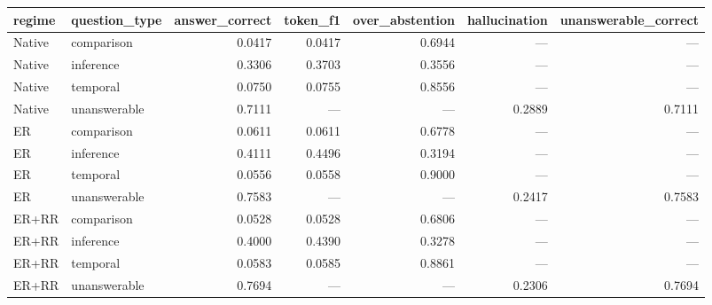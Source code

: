 \begin{tabular}{llrrrrr}
\toprule
regime & question_type & answer_correct & token_f1 & over_abstention & hallucination & unanswerable_correct \\
\midrule
Native & comparison & 0.0417 & 0.0417 & 0.6944 & — & — \\
Native & inference & 0.3306 & 0.3703 & 0.3556 & — & — \\
Native & temporal & 0.0750 & 0.0755 & 0.8556 & — & — \\
Native & unanswerable & 0.7111 & — & — & 0.2889 & 0.7111 \\
ER & comparison & 0.0611 & 0.0611 & 0.6778 & — & — \\
ER & inference & 0.4111 & 0.4496 & 0.3194 & — & — \\
ER & temporal & 0.0556 & 0.0558 & 0.9000 & — & — \\
ER & unanswerable & 0.7583 & — & — & 0.2417 & 0.7583 \\
ER+RR & comparison & 0.0528 & 0.0528 & 0.6806 & — & — \\
ER+RR & inference & 0.4000 & 0.4390 & 0.3278 & — & — \\
ER+RR & temporal & 0.0583 & 0.0585 & 0.8861 & — & — \\
ER+RR & unanswerable & 0.7694 & — & — & 0.2306 & 0.7694 \\
\bottomrule
\end{tabular}
